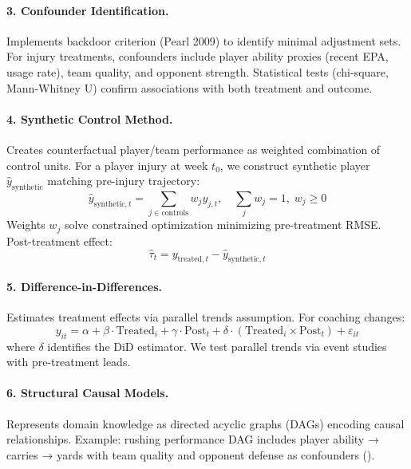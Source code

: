 \paragraph{3. Confounder Identification.}
Implements backdoor criterion (Pearl 2009) to identify minimal adjustment sets. For injury treatments, confounders include player ability proxies (recent EPA, usage rate), team quality, and opponent strength. Statistical tests (chi-square, Mann-Whitney U) confirm associations with both treatment and outcome.

\paragraph{4. Synthetic Control Method.}
Creates counterfactual player/team performance as weighted combination of control units. For a player injury at week $t_0$, we construct synthetic player $\hat{y}_{\text{synthetic}}$ matching pre-injury trajectory:
\begin{equation}
  \hat{y}_{\text{synthetic},t} = \sum_{j \in \text{controls}} w_j y_{j,t}, \quad \sum_j w_j = 1, \; w_j \geq 0
\end{equation}
Weights $w_j$ solve constrained optimization minimizing pre-treatment RMSE. Post-treatment effect:
\begin{equation}
  \hat{\tau}_t = y_{\text{treated},t} - \hat{y}_{\text{synthetic},t}
\end{equation}

\paragraph{5. Difference-in-Differences.}
Estimates treatment effects via parallel trends assumption. For coaching changes:
\begin{equation}
  y_{it} = \alpha + \beta \cdot \text{Treated}_i + \gamma \cdot \text{Post}_t + \delta \cdot (\text{Treated}_i \times \text{Post}_t) + \varepsilon_{it}
\end{equation}
where $\delta$ identifies the DiD estimator. We test parallel trends via event studies with pre-treatment leads.

\paragraph{6. Structural Causal Models.}
Represents domain knowledge as directed acyclic graphs (DAGs) encoding causal relationships. Example: rushing performance DAG includes player ability → carries → yards with team quality and opponent defense as confounders ().

